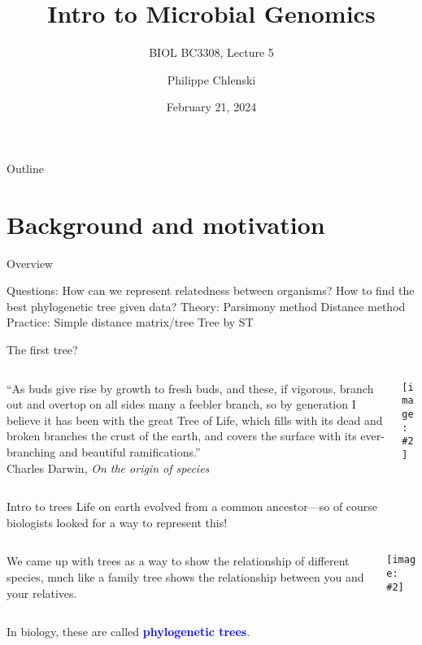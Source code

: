 \documentclass{beamer}
\title{Intro to Microbial Genomics}
\subtitle{BIOL BC3308, Lecture 5}
\author{Philippe Chlenski}
\date{February 21, 2024}
\renewcommand{\c}[1]{\begin{center}#1\end{center}}
\newcommand{\blu}[1]{\textcolor{blue}{\textbf{#1}}}
\newcommand{\gr}[2][.95]{\c{\texttt{[image: \#2]}}}
\begin{document}
\begin{frame}[plain]
\titlepage
\end{frame}

\begin{frame}{Outline}
\tableofcontents
\end{frame}

\section{Background and motivation}

\begin{frame}{Overview}
    \begin{outline}
        \1[] Questions:
            \2 How can we represent relatedness between organisms?
            \2 How to find the best phylogenetic tree given data?
        \1[] Theory:
            \2 Parsimony method
            \2 Distance method
        \1[] Practice:
            \2 Simple distance matrix/tree
            \2 Tree by ST
    \end{outline}
\end{frame}

\begin{frame}{The first tree?}
    \begin{columns}
        \begin{column}{0.7\textwidth}
            ``As buds give rise by growth to fresh buds, and these, if vigorous, branch out and overtop on all sides many a feebler branch, so by generation I believe it has been with the great Tree of Life, which fills with its dead and broken branches the crust of the earth, and covers the surface with its ever-branching and beautiful ramifications.''\\
            \bigskip
            \hfill Charles Darwin, \textit{On the origin of species}
        \end{column}
        \begin{column}{0.3\textwidth}
            \gr{l5_figs/darwin.png}
        \end{column}
    \end{columns}
\end{frame}

\begin{frame}{Intro to trees}
    Life on earth evolved from a common ancestor---so of course biologists looked for a way to represent this!\\
    \bigskip
    \begin{columns}
        \begin{column}{0.5\textwidth}
            We came up with trees as a way to show the relationship of different species, much like a family tree shows the relationship between you and your relatives.
        \end{column}
        \begin{column}{0.5\textwidth}
            \gr{l5_figs/s4_tree_archaea.png}
        \end{column}
    \end{columns}
    \bigskip
    In biology, these are called \blu{phylogenetic trees}.
\end{frame}
\end{document}
